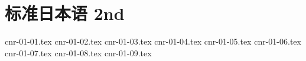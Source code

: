 \langJP

\chapter{标准日本语 \small{2nd}}

{cnr-01-01.tex}
{cnr-01-02.tex}
{cnr-01-03.tex}
{cnr-01-04.tex}
{cnr-01-05.tex}
{cnr-01-06.tex}
{cnr-01-07.tex}
{cnr-01-08.tex}
{cnr-01-09.tex}
